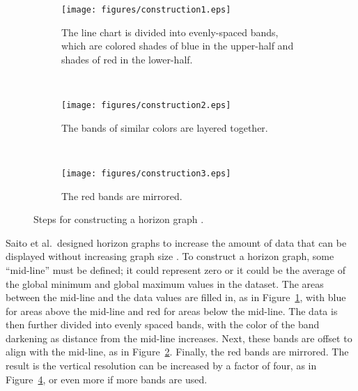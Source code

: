 \documentclass{article}
\begin{document}
\begin{figure}
        \centering
        \begin{subfigure}[b]{0.5\textwidth}
                \texttt{[image: figures/construction1.eps]}
                \caption{The line chart is divided into evenly-spaced bands, which are colored shades of blue in the upper-half and shades of red in the lower-half.}
                \label{fig:construction1}
        \end{subfigure}
        \\ 
        \begin{subfigure}[b]{0.5\textwidth}
                \texttt{[image: figures/construction2.eps]}
                \caption{The bands of similar colors are layered together.}
                \label{fig:construction2}
        \end{subfigure}
        \\
        \begin{subfigure}[b]{0.5\textwidth}
                \texttt{[image: figures/construction3.eps]}
                \caption{The red bands are mirrored.}
                \label{fig:construction3}
        \end{subfigure}
        \caption{Steps for constructing a horizon graph \cite{heer2009}.}
        \label{fig:hg_construction}
\end{figure}

Saito et al.\ designed horizon graphs to increase the amount of data that can be displayed without increasing graph size \cite{saito2005}.  To construct a horizon graph, some ``mid-line'' must be defined; it could represent zero or it could be the average of the global minimum and global maximum values in the dataset.  The areas between the mid-line and the data values are filled in, as in Figure~\ref{fig:construction1}, with blue for areas above the mid-line and red for areas below the mid-line.  The data is then further divided into evenly spaced bands, with the color of the band darkening as distance from the mid-line increases.  Next, these bands are offset to align with the mid-line, as in Figure~\ref{fig:construction2}.  Finally, the red bands are mirrored.  The result is the vertical resolution can be increased by a factor of four, as in Figure~\ref{fig:hg_construction}, or even more if more bands are used.
\end{document}
